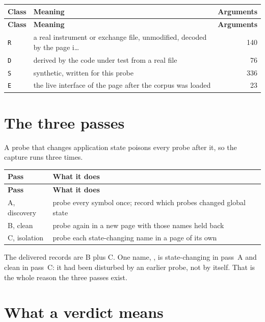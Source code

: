 {\small
\begin{xltabular}{\linewidth}{|X|l|r|}
\toprule \textbf{Class} & \textbf{Meaning} & \textbf{Arguments} \\\midrule\endfirsthead
\toprule \textbf{Class} & \textbf{Meaning} & \textbf{Arguments} \\\midrule\endhead
\texttt{R} & a real instrument or exchange file, unmodified, decoded by the page i… & 140 \\
\texttt{D} & derived by the code under test from a real file & 76 \\
\texttt{S} & synthetic, written for this probe & 336 \\
\texttt{E} & the live interface of the page after the corpus was loaded & 23 \\
\bottomrule
\end{xltabular}}


\section{The three passes}
A probe that changes application state poisons every probe after it, so the
capture runs three times.

{\small
\begin{xltabular}{\linewidth}{|X|l|}
\toprule \textbf{Pass} & \textbf{What it does} \\\midrule\endfirsthead
\toprule \textbf{Pass} & \textbf{What it does} \\\midrule\endhead
A, discovery & probe every symbol once; record which probes changed global state \\
B, clean & probe again in a new page with those names held back \\
C, isolation & probe each state-changing name in a page of its own \\
\bottomrule
\end{xltabular}}


The delivered records are B plus C. One name, , is state-changing
in pass~A and clean in pass~C: it had been disturbed by an earlier probe, not by
itself. That is the whole reason the three passes exist.

\section{What a verdict means}

